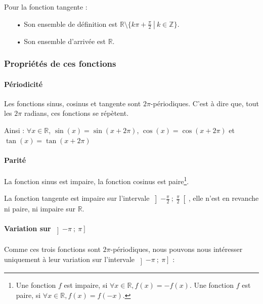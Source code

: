 \documentclass[a4paper]{article}
\begin{document}
					Pour la fonction tangente :
					\begin{itemize}
						\item [•] Son ensemble de définition est $\mathbb{R} \setminus \{\left. k\pi+\frac{\pi}{2} ~ \right| ~ k \in \mathbb{Z}\}$.
						\item [•] Son ensemble d'arrivée est $\mathbb{R}$.
					\end{itemize}

			\subsubsection{Propriétés de ces fonctions}
				\paragraph*{Périodicité}
					\phantom{r}

					Les fonctions sinus, cosinus et tangente sont $2\pi$-périodiques.
					C'est à dire que, tout les $2\pi$ radians, ces fonctions se répètent.
					
					Ainsi : $\forall x \in \mathbb{R}$, $\sin(x) = \sin(x + 2\pi)$, $\cos(x) = \cos(x + 2\pi)$ et $\tan(x) = \tan(x + 2\pi)$
				\paragraph*{Parité}
					\phantom{r}

					La fonction sinus est impaire, la fonction cosinus est paire\footnote{
						Une fonction $f$ est impaire, si $\forall x \in \mathbb{R}, f(x) = -f(x)$.
						Une fonction $f$ est paire, si $\forall x \in \mathbb{R}, f(x) = f(-x)$.}.
					
					La fonction tangente est impaire sur l'intervale $\left] -\frac{\pi}{2}~;~\frac{\pi}{2} \right[$, 
					elle n'est en revanche ni paire, ni impaire sur $\mathbb{R}$.

				\paragraph*{Variation sur $\left] -\pi ~;~ \pi\right]$}
					\phantom{r}
					
					Comme ces trois fonctions sont $2\pi$-périodiques,
					nous pouvons nous intéresser uniquement à leur variation sur l'intervale $\left] -\pi ~;~ \pi \right]$ :

					\vspace{3mm}
\end{document}
